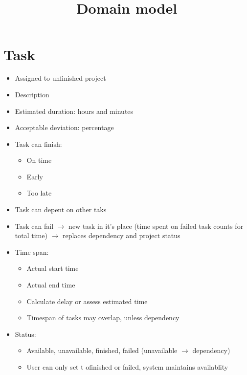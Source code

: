 \documentclass[11pt]{article}
\title{\textbf{Domain model}}
\author{}
\date{}
\begin{document}
\maketitle

\section{Task}

\begin{itemize}
\item Assigned to unfinished project
\item Description
\item Estimated duration: hours and minutes
\item Acceptable deviation: percentage
\item Task can finish:
\begin{itemize}
\item On time
\item Early
\item Too late
\end{itemize}
\item Task can depent on other taks
\item Task can fail $\rightarrow$ new task in it's place (time spent on failed task counts for total time) $\rightarrow$ replaces dependency and project status
\item Time span:
\begin{itemize}
\item Actual start time
\item Actual end time
\item Calculate delay or assess estimated time
\item Timespan of tasks may overlap, unless dependency
\end{itemize}
\item Status:
\begin{itemize}
\item Available, unavailable, finished, failed (unavailable $\rightarrow$ dependency)
\item User can only set t ofinished or failed, system maintains availablity
\end{itemize}
\end{itemize}
\end{document}
